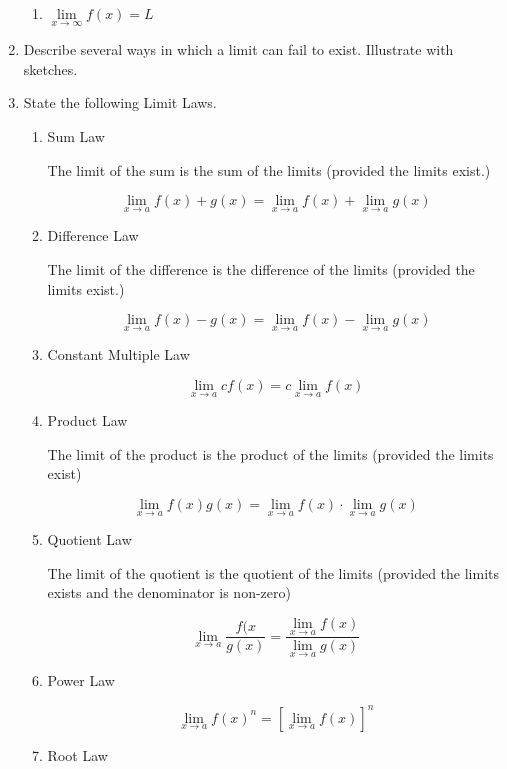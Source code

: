 \documentclass{article}
\begin{document}
\begin{enumerate}
\begin{enumerate}
			\item $\lim \limits _{x \to \infty} f(x) = L$
		\end{enumerate}

		\item Describe several ways in which a limit can fail to exist.
			Illustrate with sketches.

		\item State the following Limit Laws.

		\begin{enumerate}
			\item Sum Law

			The limit of the sum is the sum of the limits (provided
			the limits exist.)

			$$\lim \limits _{x \to a} f(x) + g(x) = \lim \limits _{x \to a} f(x) + \lim \limits _{x \to a} g(x)$$

			\item Difference Law

			The limit of the difference is the difference of the limits (provided
			the limits exist.)

			$$\lim \limits _{x \to a} f(x) - g(x) = \lim \limits _{x \to a} f(x) - \lim \limits _{x \to a} g(x)$$

			\item Constant Multiple Law

			$$\lim \limits _{x \to a} c f(x) = c \lim \limits _{x \to a} f(x)$$

			\item Product Law

			The limit of the product is the product of the limits (provided the limits exist)

			$$\lim \limits _{x \to a} f(x) g(x) = \lim \limits _{x \to a} f(x) \cdot \lim \limits _{x \to a} g(x)$$

			\item Quotient Law

			The limit of the quotient is the quotient of the limits (provided the limits exists and
			the denominator is non-zero)

			$$\lim \limits _{x \to a} \frac{f(x}{g(x)} = \frac{\lim \limits _{x \to a} f(x)}{\lim \limits _{x \to a} g(x)}$$

			\item Power Law

			$$ \lim \limits _{x \to a} f(x)^{n} = [\lim \limits _{x \to a} f(x)]^{n}$$

			\item Root Law


\end{enumerate}
\end{enumerate}
\end{document}

